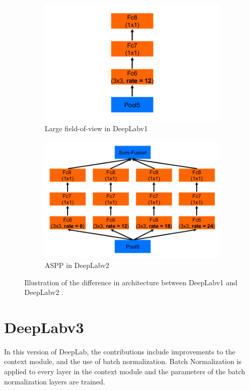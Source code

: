 	\begin{figure}
		\begin{subfigure}{.5\textwidth}
			\centering
			\includegraphics[width=1.03\linewidth]{images/v1_largeFOV}
			\caption{Large field-of-view in DeepLabv1}
		\end{subfigure}
		\begin{subfigure}{.5\textwidth}
			\centering
			\includegraphics[width=1\linewidth]{images/v2_aspp}
			\caption{ASPP in DeepLabv2}
		\end{subfigure}
		\caption{Illustration of the difference in architecture between DeepLabv1 and DeepLabv2 \cite{DBLP:journals/corr/ChenPK0Y16}.}
		\label{Fig:v1vsv2}
	\end{figure}
	
\section{DeepLabv3}
In this version of DeepLab, the contributions include improvements to the context module, and the use of batch normalization. Batch Normalization is applied to every layer in the context module and the parameters of the batch normalization layers are trained.

